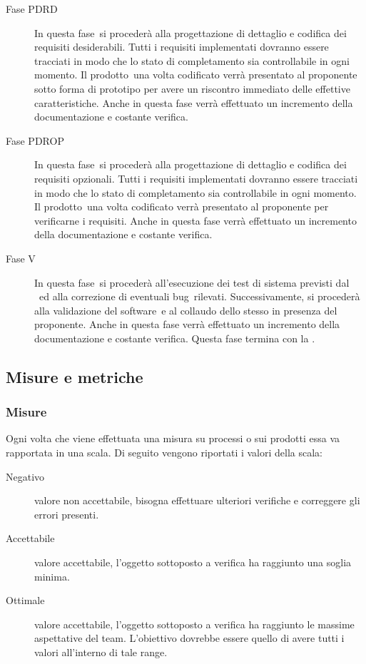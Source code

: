 \documentclass[../PianoDiQualifica.tex]{subfiles}
\begin{document}
\begin{description}
		 	\item[Fase PDRD] In questa fase\g\ 
si procederà alla progettazione di dettaglio e codifica dei requisiti desiderabili. Tutti i requisiti implementati dovranno essere tracciati in modo che lo stato di completamento sia controllabile in ogni momento. Il prodotto\g\ una volta codificato verrà presentato al proponente sotto forma di prototipo per avere un riscontro immediato delle effettive caratteristiche. Anche in questa fase verrà effettuato un incremento della documentazione e costante verifica.
		 	\item[Fase PDROP] In questa fase\g\ 
si procederà alla progettazione di dettaglio e codifica dei requisiti opzionali. Tutti i requisiti implementati dovranno essere tracciati in modo che lo stato di completamento sia controllabile in ogni momento. Il prodotto\g\ una volta codificato verrà presentato al proponente per verificarne i requisiti. Anche in questa fase verrà effettuato un incremento della documentazione e costante verifica.
			\item[Fase V] In questa fase\g\ 
si procederà all'esecuzione dei test di sistema previsti dal \pianodiqualifica\ ed alla correzione di eventuali bug\g\ rilevati. Successivamente, si procederà alla validazione del software\g\ e al collaudo dello stesso in presenza del proponente. Anche in questa fase verrà effettuato un incremento della documentazione e costante verifica. Questa fase termina con la \revisionediaccettazione.
		\end{description}
		\subsection{Misure e metriche}
			\subsubsection{Misure}
			Ogni volta che viene effettuata una misura su processi o sui prodotti essa va rapportata in una scala. Di seguito vengono riportati i valori della scala:
			\begin{description}
			\item[Negativo] valore non accettabile, bisogna effettuare ulteriori verifiche e correggere gli errori presenti.
			\item[Accettabile] valore accettabile, l'oggetto sottoposto a verifica ha raggiunto una soglia minima.
			\item[Ottimale] valore accettabile, l'oggetto sottoposto a verifica ha raggiunto le massime aspettative del team\g. L'obiettivo dovrebbe essere quello di avere tutti i valori all'interno di tale range. 
			\end{description}
\end{document}
